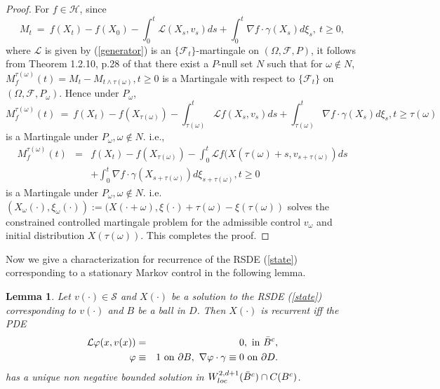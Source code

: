 \documentclass[11pt]{amsart}
\newtheorem{lemma}{\bf Lemma}[section]
\numberwithin{equation}{section}
\begin{document}
\begin{proof} For $f \in {\mathcal H}$, since 
\[
M_t \ = \ f(X_t) - f(X_0) - \int^t_0 {\mathcal L} (X_s, v_s) ds + \int^t_0 \nabla f \cdot \gamma (X_s) d \xi_s
, \ t \geq 0,
\]
where ${\mathcal L}$ is given by (\ref{generator})
is an $\{\mathcal {F}_t\}$-martingale on $(\Omega, {\mathcal  F}, P)$, it follows from Theorem 1.2.10, p.28
of \cite{stroock_varadhan} that there exist a $P$-null set $N$ such that for $\omega \notin N$,
$M^{\tau (\omega)}_f (t) = M_t - M_{t \wedge \tau(\omega)} , t \geq 0$ is a Martingale with respect to 
$\{\mathcal {F}_t\}$ on $(\Omega, {\mathcal F}, P_{\omega})$. 
Hence under $P_{\omega}$, 
\[
M^{\tau (\omega)}_f (t) \ = \ f(X_t) - f(X_{\tau(\omega)}) - \int^t_{\tau(\omega)} {\mathcal L} f(X_s, v_s) ds
+ \int^t_{\tau (\omega)} \nabla f \cdot \gamma (X_s) d \xi_s ,  t \geq \tau(\omega) 
\]
is a Martingale under $P_{\omega} , \omega \notin N$. 
i.e.,
\begin{eqnarray*}
M^{\tau (\omega)}_f (t) & = & f(X_t) - f(X_{\tau(\omega)}) - \int^t_0 {\mathcal L} 
f(X(\tau(\omega) + s, v_{s + \tau(\omega)}) ds \\
&& + \int^t_0\nabla f \cdot \gamma (X_{s + \tau (\omega)}) d \xi_{s + \tau(\omega)} ,  t \geq 0 
\end{eqnarray*}
is a Martingale under $P_{\omega} , \omega \notin N$. i.e. $(X_{\omega} (\cdot) , \xi_{\omega}(\cdot)) 
:= (X(\cdot + \omega), \xi(\cdot) + \tau(\omega) - \xi(\tau(\omega))$ solves the constrained controlled 
martingale problem for the admissible control $v_{\omega}$ and initial distribution $X(\tau (\omega))$. This completes the 
proof. 
\end{proof}
Now we give a characterization for recurrence of the RSDE (\ref{state}) corresponding to a stationary
Markov control in the following lemma.
\begin{lemma} Let $v (\cdot) \in \mathcal{S}$ and $X(\cdot)$ be a solution to the RSDE (\ref{state})
corresponding to $v(\cdot)$ and $B$ be a ball  in $D$. Then
$X(\cdot)$ is recurrent iff the PDE
\begin{eqnarray}\label{pdeexterior}
\mathcal{L} \varphi (x, v(x)) & = & 0, \ {\rm in} \ \Bar{B}^c, \nonumber \\ 
\varphi & \equiv & 1 \ {\rm on}\ \partial B, \ \nabla \varphi \cdot \gamma \equiv 0 \ {\rm on} \ \partial D.
\end{eqnarray}
has a unique non negative bounded solution in $W^{2, d +1}_{loc} (\Bar{B}^c) \cap C(B^c)$.
\end{lemma}
\end{document}
